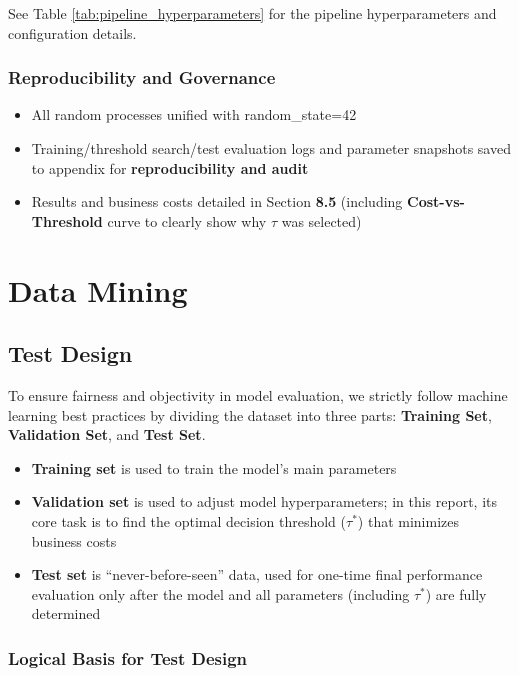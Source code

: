 \documentclass[sigplan,screen]{acmart}
\begin{document}
See Table \ref{tab:pipeline_hyperparameters} for the pipeline hyperparameters and configuration details.

\subsubsection{Reproducibility and Governance}

\begin{itemize}
\item All random processes unified with random\_state=42
\item Training/threshold search/test evaluation logs and parameter snapshots saved to appendix for \textbf{reproducibility and audit}
\item Results and business costs detailed in Section \textbf{8.5} (including \textbf{Cost-vs-Threshold} curve to clearly show why $\tau$ was selected)
\end{itemize}

\section{Data Mining}

\subsection{Test Design}

To ensure fairness and objectivity in model evaluation, we strictly follow machine learning best practices by dividing the dataset into three parts: \textbf{Training Set}, \textbf{Validation Set}, and \textbf{Test Set}.

\begin{itemize}
\item \textbf{Training set} is used to train the model's main parameters
\item \textbf{Validation set} is used to adjust model hyperparameters; in this report, its core task is to find the optimal decision threshold ($\tau^*$) that minimizes business costs
\item \textbf{Test set} is ``never-before-seen'' data, used for one-time final performance evaluation only after the model and all parameters (including $\tau^*$) are fully determined
\end{itemize}

\subsubsection{Logical Basis for Test Design}
\end{document}
